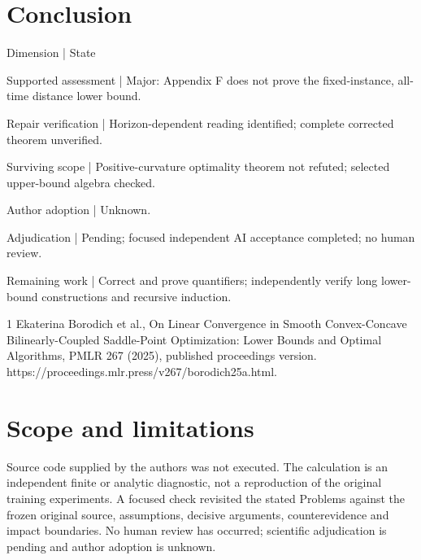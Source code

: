 \documentclass[10pt]{article}
\begin{document}
\section*{Conclusion}
Dimension | State\par
Supported assessment | Major: Appendix F does not prove the fixed-instance, all-time distance lower bound.\par
Repair verification | Horizon-dependent reading identified; complete corrected theorem unverified.\par
Surviving scope | Positive-curvature optimality theorem not refuted; selected upper-bound algebra checked.\par
Author adoption | Unknown.\par
Adjudication | Pending; focused independent AI acceptance completed; no human review.\par
Remaining work | Correct and prove quantifiers; independently verify long lower-bound constructions and recursive induction.\par
1 Ekaterina Borodich et al., On Linear Convergence in Smooth Convex-Concave Bilinearly-Coupled Saddle-Point Optimization: Lower Bounds and Optimal Algorithms, PMLR 267 (2025), published proceedings version. https://proceedings.mlr.press/v267/borodich25a.html.\par
\section*{Scope and limitations}
Source code supplied by the authors was not executed. The calculation is an independent finite or analytic diagnostic, not a reproduction of the original training experiments. A focused check revisited the stated Problems against the frozen original source, assumptions, decisive arguments, counterevidence and impact boundaries. No human review has occurred; scientific adjudication is pending and author adoption is unknown.\par
\end{document}

